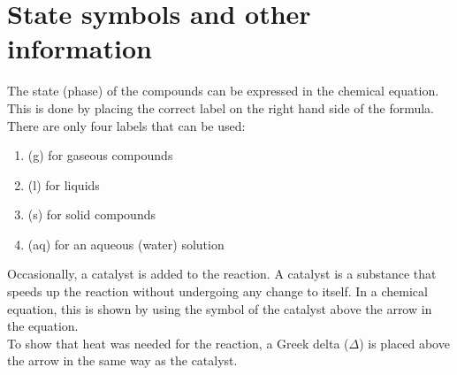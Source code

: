 \section{State symbols and other information}

The state (phase) of the compounds can be expressed in the chemical equation. This is done by placing the correct label on the right hand side of the formula. There are only four labels that can be used:

\begin{enumerate}
\item{(g) for gaseous compounds}
\item{(l) for liquids}
\item{(s) for solid compounds}
\item{(aq) for an aqueous (water) solution}
\end{enumerate}

Occasionally, a catalyst is added to the reaction. A catalyst is a substance that speeds up the reaction without undergoing any change to itself. In a chemical equation, this is shown by using the symbol of the catalyst above the arrow in the equation.\\

To show that heat was needed for the reaction, a Greek delta (\textbf{$\Delta$}) is placed above the arrow in the same way as the catalyst.


